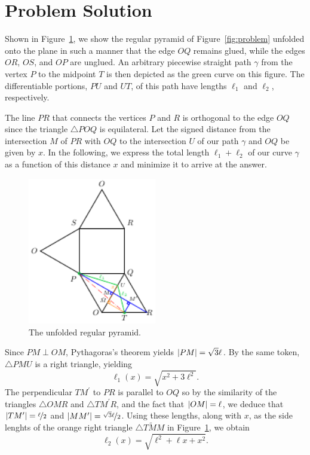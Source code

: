 \section{Problem Solution}
\label{sec:solution}

Shown in Figure~\ref{fig:unfolded}, we show the regular pyramid of
Figure~\ref{fig:problem} unfolded onto the plane in such a manner that the edge
$OQ$ remains glued, while the edges $OR$, $OS$, and $OP$ are unglued. An
arbitrary piecewise straight path $\gamma$ from the vertex $P$ to the midpoint
$T$ is then depicted as the green curve on this figure. The differentiable portions,
$PU$ and $UT$, of this path have lengths $\ell_1$ and $\ell_2$, respectively.

The line $PR$ that connects the vertices $P$ and $R$ is orthogonal to the edge
$OQ$ since the triangle $\triangle POQ$ is equilateral. Let the signed distance
from the intersection $M$ of $PR$ with $OQ$ to the intersection $U$ of our path
$\gamma$ and $OQ$ be given by $x$. In the following, we express the total length
$\ell_1 + \ell_2$ of our curve $\gamma$ as a function of this distance $x$ and
minimize it to arrive at the answer.

\begin{figure}[h]
  \centering
  \includegraphics[trim={0 0 0
  0cm},clip,width=0.5\textwidth]{./figures/pyramid-unfolded.pdf}
  \vspace{-8mm}
  \caption{The unfolded regular pyramid.}
  \label{fig:unfolded}
\end{figure}

Since $PM \perp OM$, Pythagoras's theorem yields $\left|{PM}\right| = \sqrt{3}\ell$. By
the same token, $\triangle PMU$ is a right triangle, yielding 
%
\begin{equation}
    \ell_1(x) = \sqrt{x^2 + 3\ell^2}. 
    \label{eq:ell1}
\end{equation}    
%
The perpendicular $TM^\prime$ to $PR$ is parallel to $OQ$ so by the similarity
of the triangles $\triangle OMR$ and $\triangle TM^\prime R$, and the fact that
$\left|{OM}\right| = \ell$, we deduce that $\left|{TM^\prime}\right| = \nicefrac{\ell}{2}$ and
$\left|{MM^\prime}\right| = \nicefrac{\sqrt{3}\ell}{2}$. Using these lengths, along with
$x$, as the side lenghts of the orange right triangle $\triangle T\tilde{M}M$ in
Figure~\ref{fig:unfolded}, we obtain 
%
\begin{equation}
  \ell_2(x) = \sqrt{\ell^2 + \ell x + x^2}.
  \label{eq:ell2}
\end{equation}

